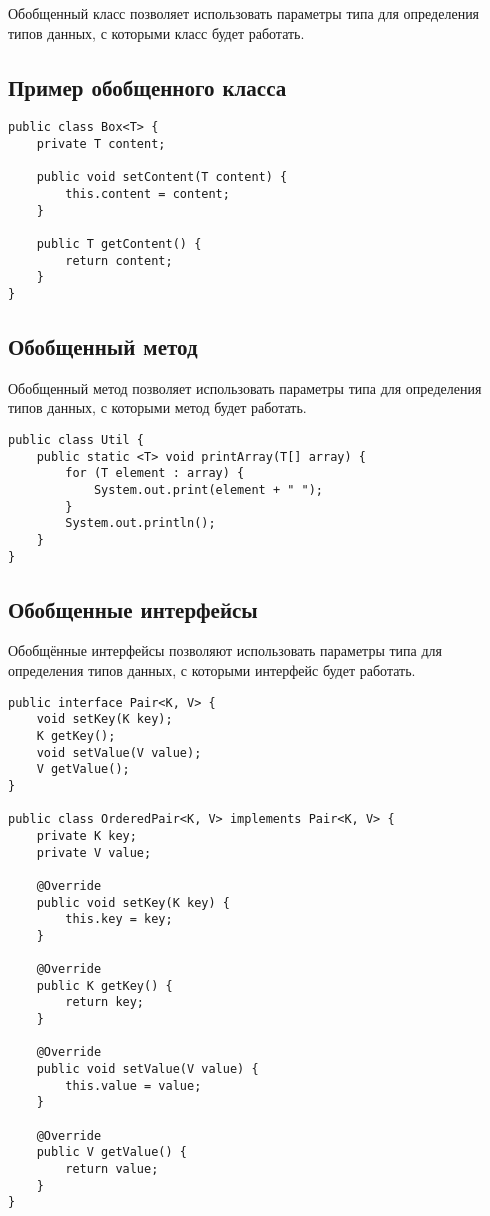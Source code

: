 \documentclass[12pt, a4paper]{article}
\begin{document}
Обобщенный класс позволяет использовать параметры типа для определения типов данных, с которыми класс будет работать.

\subsection*{Пример обобщенного класса}

\begin{verbatim}
public class Box<T> {
    private T content;

    public void setContent(T content) {
        this.content = content;
    }

    public T getContent() {
        return content;
    }
}
\end{verbatim}

\subsection*{Обобщенный метод}
Обобщенный метод позволяет использовать параметры типа для определения типов данных, с которыми метод будет работать.

\begin{verbatim}
public class Util {
    public static <T> void printArray(T[] array) {
        for (T element : array) {
            System.out.print(element + " ");
        }
        System.out.println();
    }
}
\end{verbatim}

\subsection*{Обобщенные интерфейсы}
Обобщённые интерфейсы позволяют использовать параметры типа для определения типов данных, с которыми интерфейс будет работать.

\begin{verbatim}
public interface Pair<K, V> {
    void setKey(K key);
    K getKey();
    void setValue(V value);
    V getValue();
}

public class OrderedPair<K, V> implements Pair<K, V> {
    private K key;
    private V value;

    @Override
    public void setKey(K key) {
        this.key = key;
    }

    @Override
    public K getKey() {
        return key;
    }

    @Override
    public void setValue(V value) {
        this.value = value;
    }

    @Override
    public V getValue() {
        return value;
    }
}
\end{verbatim}
\end{document}
